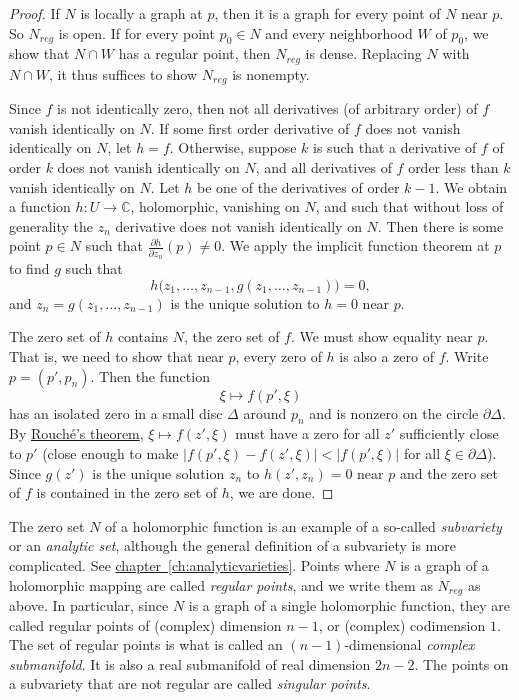 \documentclass[12pt,openany]{book}
\newcommand{\sabs}[1]{\lvert {#1} \rvert}
\newcommand{\C}{{\mathbb{C}}}
\newcommand{\myindex}[1]{#1\index{#1}}
\theoremstyle{plain}
\theoremstyle{remark}
\theoremstyle{definition}
\theoremstyle{exercise}
\theoremstyle{example}
\newcommand{\chapterref}[1]{\hyperref[#1]{chapter~\ref*{#1}}}
\begin{document}
\begin{proof}
If $N$ is locally a graph at $p$, then it is a graph
for every point of $N$ near $p$.  So $N_{\mathit{reg}}$
is open.
If for every point $p_0 \in N$
and every neighborhood $W$ of $p_0$, we show that
$N \cap W$ has a regular point, then $N_{\mathit{reg}}$ is dense.
Replacing $N$ with $N \cap W$, it thus suffices to show
$N_{\mathit{reg}}$ is nonempty.

Since $f$ is not identically zero, then not all derivatives (of arbitrary
order) of $f$
vanish identically on $N$.
If some first order derivative of $f$ does not vanish identically on $N$,
let $h=f$.
Otherwise, suppose $k$ is such that a derivative of $f$ of order $k$
does not vanish identically on $N$, and
all derivatives of $f$ order less than $k$ vanish identically on
$N$.  Let $h$ be one of the derivatives of order $k-1$.
We obtain a function $h \colon U \to \C$, holomorphic, vanishing on $N$,
and such that
without loss of generality the $z_n$ derivative does not vanish identically
on $N$.  Then there is some point $p \in N$ such that $\frac{\partial
h}{\partial z_n}(p) \not= 0$.
We apply the implicit function theorem at $p$ to find $g$ such that
\begin{equation*}
h\bigr(z_1,\ldots,z_{n-1},g(z_1,\ldots,z_{n-1})\bigr) = 0 ,
\end{equation*}
and $z_n = g(z_1,\ldots,z_{n-1})$ is the unique solution to
$h=0$ near $p$.

The zero set of $h$ contains $N$, the zero set of $f$.
We must show equality near $p$.  That is, we need to show that
near $p$, every zero of $h$ is also a zero of $f$.
Write $p = (p',p_n)$.  Then the function
\begin{equation*}
\xi \mapsto f(p',\xi)
\end{equation*}
has an isolated zero in a small disc $\Delta$ around $p_n$ and is
nonzero on the circle $\partial \Delta$.  By
\hyperref[thm:onevarrouche]{Rouch\'e's theorem},
$\xi \mapsto f(z',\xi)$ must have a zero for all $z'$ sufficiently close to $p'$
(close enough to make $\sabs{f(p',\xi)-f(z',\xi)} < \sabs{f(p',\xi)}$ for all $\xi \in
\partial \Delta$).
Since $g(z')$ is the unique solution $z_n$ to $h(z',z_n) = 0$
near $p$ and the
zero set of $f$ is contained in the zero set of $h$, we are done.
\end{proof}

The zero set $N$ of a holomorphic function is an example of a so-called
\emph{\myindex{subvariety}}
or an \emph{\myindex{analytic set}},
although the general definition of a
subvariety is more complicated.
See \chapterref{ch:analyticvarieties}.
Points where $N$ is a graph of a holomorphic mapping are called
\emph{regular points}, and we write them as
$N_{\mathit{reg}}$ as above.  In particular,
since $N$ is a graph of a single holomorphic function, they are called
regular points of (complex) dimension $n-1$, or (complex) codimension $1$.
The set of regular points is what is called an
$(n-1)$-dimensional \emph{\myindex{complex submanifold}}.
It is also a real
submanifold of real dimension $2n-2$.
The points on a subvariety that are not regular are called
\emph{singular points}.
\end{document}
